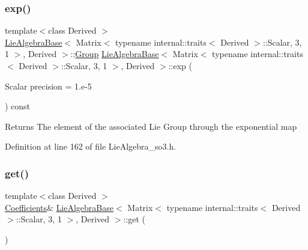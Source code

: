 \subsubsection{\texorpdfstring{exp()}{exp()}}
{\footnotesize\ttfamily template$<$class Derived $>$ \\
\hyperlink{class_lie_algebra_base}{Lie\+Algebra\+Base}$<$ Matrix$<$ typename internal\+::traits$<$ Derived $>$\+::Scalar, 3, 1 $>$, Derived $>$\+::\hyperlink{class_lie_algebra_base_3_01_matrix_3_01typename_01internal_1_1traits_3_01_derived_01_4_1_1_scalabfa0bdce6d9781ee940346c3f6d91f4e_ac400b52908b18fbf91ce3f942c2841e9}{Group} \hyperlink{class_lie_algebra_base}{Lie\+Algebra\+Base}$<$ Matrix$<$ typename internal\+::traits$<$ Derived $>$\+::Scalar, 3, 1 $>$, Derived $>$\+::exp (\begin{DoxyParamCaption}\item[{Scalar}]{precision = {\ttfamily 1.e-\/5} }\end{DoxyParamCaption}) const\hspace{0.3cm}{\ttfamily [inline]}}

\begin{DoxyReturn}{Returns}
The element of the associated Lie Group through the exponential map 
\end{DoxyReturn}


Definition at line 162 of file Lie\+Algebra\+\_\+so3.\+h.

\hypertarget{class_lie_algebra_base_3_01_matrix_3_01typename_01internal_1_1traits_3_01_derived_01_4_1_1_scalabfa0bdce6d9781ee940346c3f6d91f4e_a087b980c393345af2614f8a7ee5fb45f}{}\label{class_lie_algebra_base_3_01_matrix_3_01typename_01internal_1_1traits_3_01_derived_01_4_1_1_scalabfa0bdce6d9781ee940346c3f6d91f4e_a087b980c393345af2614f8a7ee5fb45f} 
\subsubsection{\texorpdfstring{get()}{get()}\hspace{0.1cm}{\footnotesize\ttfamily [1/2]}}
{\footnotesize\ttfamily template$<$class Derived $>$ \\
\hyperlink{class_lie_algebra_base_3_01_matrix_3_01typename_01internal_1_1traits_3_01_derived_01_4_1_1_scalabfa0bdce6d9781ee940346c3f6d91f4e_a36f132794b928bcf1f707bf88d392288}{Coefficients}\& \hyperlink{class_lie_algebra_base}{Lie\+Algebra\+Base}$<$ Matrix$<$ typename internal\+::traits$<$ Derived $>$\+::Scalar, 3, 1 $>$, Derived $>$\+::get (\begin{DoxyParamCaption}{ }\end{DoxyParamCaption})\hspace{0.3cm}{\ttfamily [inline]}}

